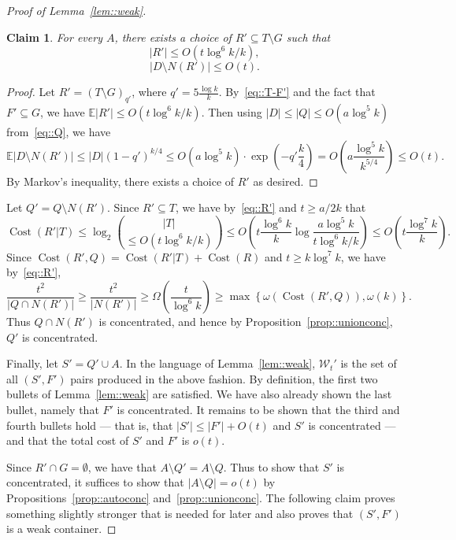 \documentclass[12pt]{article}
\DeclareMathOperator{\cost}{Cost}
\newtheorem{claim}[theorem]{Claim}
\begin{document}
\begin{proof}[Proof of Lemma~\ref{lem::weak}]
\begin{claim}
For every $A$, there exists a choice of $R' \subseteq T \setminus G$ such that
\begin{equation}\label{eq::R'}
|R'| \leq O(t \log^6 k / k) ,
\end{equation}
\begin{equation}\label{eq::D-N(R')}
|D \setminus N(R')| \leq O(t) .
\end{equation}
\end{claim}

\begin{proof}
Let $R' = (T \setminus G)_{q'}$, where $q' = 5 \frac{\log k}{k}$. By~\eqref{eq::T-F'} and the fact that $F' \subseteq G$, we have $\mathbb{E}|R'| \leq O(t \log^6 k / k)$. Then using $|D| \leq |Q| \leq O(a \log^5 k)$ from~\eqref{eq::Q}, we have
\[ \mathbb{E}|D \setminus N(R')| \leq |D|(1-q')^{k/4} \leq O(a\log^5 k) \cdot \exp\left( -q' \frac{k}{4} \right) = O\left( a \frac{\log^5 k}{k^{5/4}} \right) \leq O(t) .\]
By Markov's inequality, there exists a choice of $R'$ as desired.
\end{proof}

Let $Q' = Q \setminus N(R')$. Since $R' \subseteq T$, we have by~\eqref{eq::R'} and $t \geq a/2k$ that
\begin{equation}\label{eq::costR'}
\cost(R'|T) \leq \log_2 \binom{|T|}{\leq O(t \log^6 k / k)} \leq O\left( t \frac{\log^6 k}{k} \log\frac{a \log^5 k}{t \log^6 k / k} \right) \leq O\left( t \frac{\log^7 k}{k} \right) .
\end{equation}
Since $\cost(R',Q) = \cost(R'|T) + \cost(R)$ and $t \geq k\log^7 k$, we have by~\eqref{eq::R'},
\[ \frac{t^2}{|Q \cap N(R')|} \geq \frac{t^2}{|N(R')|} \geq \Omega\left( \frac{t}{\log^6 k} \right) \geq \max\left\{\omega(\cost(R',Q)), \omega(k)\right\} .\]
Thus $Q \cap N(R')$ is concentrated, and hence by Proposition~\ref{prop::unionconc}, $Q'$ is concentrated.

Finally, let $S' = Q' \cup A$. In the language of Lemma~\ref{lem::weak}, $\mathcal{W}_t'$ is the set of all $(S',F')$ pairs produced in the above fashion. By definition, the first two bullets of Lemma~\ref{lem::weak} are satisfied. We have also already shown the last bullet, namely that $F'$ is concentrated. It remains to be shown that the third and fourth bullets hold --- that is, that $|S'| \leq |F'| + O(t)$ and $S'$ is concentrated --- and that the total cost of $S'$ and $F'$ is $o(t)$.

Since $R' \cap G = \emptyset$, we have that $A \setminus Q' = A \setminus Q$. Thus to show that $S'$ is concentrated, it suffices to show that $|A \setminus Q| = o(t)$ by Propositions~\ref{prop::autoconc} and~\ref{prop::unionconc}. The following claim proves something slightly stronger that is needed for later and also proves that $(S',F')$ is a weak container.


\end{proof}
\end{document}

